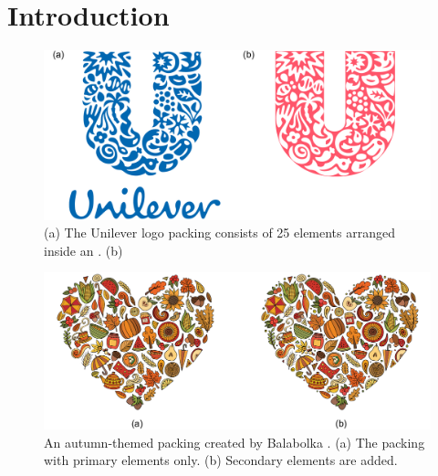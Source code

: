 
\chapter{Introduction}
\label{chapter_introduction}

\begin{figure}
\centering
\includegraphics[width=1.0\textwidth]{figures/intro/unilever_w_neg_space.pdf} 
\caption[Unilever logo packing and its negative space]
{\label{fig_logo_packing} 
(a) The Unilever logo packing consists of 25 elements arranged inside an . 
(b) 
}
\end{figure}

\begin{figure}
\centering
\includegraphics[width=1.0\textwidth]{figures/intro/primary_secondary.pdf}
\caption[Primary and secondary elements]{
  \label{fig_primary_secondary}
  \newtext
  {
  An autumn-themed packing created by Balabolka . }
  (a) The packing with primary elements only.
  (b) Secondary elements are added. 
}
\end{figure}

